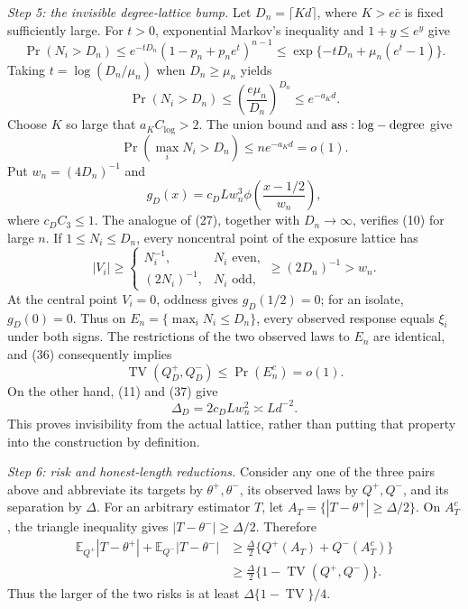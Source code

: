 \textit{Step 5: the invisible degree-lattice bump.}
Let \(D_n=\lceil Kd\rceil\), where \(K>e\bar c\) is fixed sufficiently large.  For \(t>0\), exponential Markov's inequality and \(1+y\leq e^y\) give
\[
 \Pr(N_i>D_n)
 \leq e^{-tD_n}(1-p_n+p_ne^t)^{n-1}
 \leq\exp\{-tD_n+\mu_n(e^t-1)\}.
\]
Taking \(t=\log(D_n/\mu_n)\) when \(D_n\geq\mu_n\) yields
\[
 \Pr(N_i>D_n)\leq\left(\frac{e\mu_n}{D_n}\right)^{D_n}
 \leq e^{-a_Kd}.
\tag{35}
\]
Choose \(K\) so large that \(a_KC_{\log}>2\).  The union bound and \({\rm ass:log-degree}\) give
\[
 \Pr\left(\max_iN_i>D_n\right)
 \leq ne^{-a_Kd}=o(1).
\tag{36}
\]
Put \(w_n=(4D_n)^{-1}\) and
\[
 g_D(x)=c_D Lw_n^3\phi\!\left(\frac{x-1/2}{w_n}\right),
\tag{37}
\]
where \(c_DC_3\leq1\).  The analogue of (27), together with \(D_n\to\infty\), verifies (10) for large \(n\).  If \(1\leq N_i\leq D_n\), every noncentral point of the exposure lattice has
\[
 |V_i|\geq\begin{cases}N_i^{-1},&N_i\text{ even},\\(2N_i)^{-1},&N_i\text{ odd},\end{cases}
 \geq(2D_n)^{-1}>w_n.
\tag{38}
\]
At the central point \(V_i=0\), oddness gives \(g_D(1/2)=0\); for an isolate, \(g_D(0)=0\).  Thus on \(E_n=\{\max_iN_i\leq D_n\}\), every observed response equals \(\xi_i\) under both signs.  The restrictions of the two observed laws to \(E_n\) are identical, and (36) consequently implies
\[
 \operatorname{TV}(Q_D^+,Q_D^-)
 \leq\Pr(E_n^c)=o(1).
\tag{39}
\]
On the other hand, (11) and (37) give
\[
 \Delta_D=2c_D Lw_n^2\asymp Ld^{-2}.
\tag{40}
\]
This proves invisibility from the actual lattice, rather than putting that property into the construction by definition.

\textit{Step 6: risk and honest-length reductions.}
Consider any one of the three pairs above and abbreviate its targets by \(\theta^+,\theta^-\), its observed laws by \(Q^+,Q^-\), and its separation by \(\Delta\).  For an arbitrary estimator \(T\), let \(A_T=\{|T-\theta^+|\geq\Delta/2\}\).  On \(A_T^c\), the triangle inequality gives \(|T-\theta^-|\geq\Delta/2\).  Therefore
\[
 \begin{aligned}
 \mathbb E_{Q^+}|T-\theta^+|+\mathbb E_{Q^-}|T-\theta^-|
 &\geq\frac\Delta2\{Q^+(A_T)+Q^-(A_T^c)\}\\
 &\geq\frac\Delta2\{1-\operatorname{TV}(Q^+,Q^-)\}.
 \end{aligned}
\tag{41}
\]
Thus the larger of the two risks is at least \(\Delta\{1-\operatorname{TV}\}/4\).


